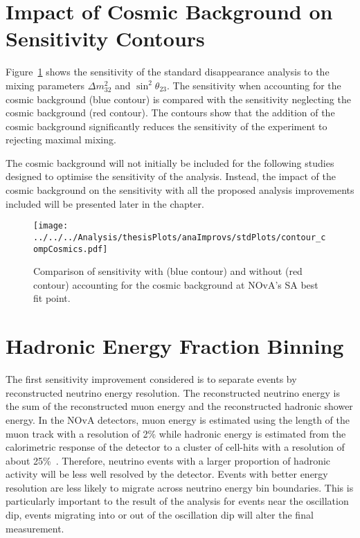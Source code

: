\section{Impact of Cosmic Background on Sensitivity Contours}

Figure~\ref{fig:stdContourWithCosmics} shows the sensitivity of the
standard disappearance analysis to the mixing parameters $\Delta
m^2_{32}$ and $\sin^2\theta_{23}$. The sensitivity when accounting for
the cosmic background (blue contour) is compared with the sensitivity
neglecting the cosmic background (red contour). 
The contours show that the addition of the cosmic background
significantly reduces the sensitivity of the experiment to rejecting
maximal mixing.  

The cosmic background will not initially be included for the following
studies designed to optimise the sensitivity of the analysis. 
Instead, the impact of the cosmic background on the sensitivity with
all the proposed analysis improvements included will be presented
later in the chapter.



\begin{figure}
  \centering
\texttt{[image: ../../../Analysis/thesisPlots/anaImprovs/stdPlots/contour\_compCosmics.pdf]}
  \caption{
    Comparison of sensitivity with (blue contour) and without (red
    contour) accounting for the cosmic background at NOvA's SA best fit
    point.
  } 
  \label{fig:stdContourWithCosmics}
\end{figure}



\section{Hadronic Energy Fraction Binning}

The first sensitivity improvement considered is to separate events by
reconstructed neutrino energy resolution. 
The reconstructed neutrino energy is the sum of the reconstructed
muon energy and the reconstructed hadronic shower energy.
In the NOvA detectors, muon energy is estimated using the length of
the muon track with a resolution of 2\% while hadronic energy is
estimated from the calorimetric response of the detector to a cluster
of cell-hits with a resolution of about 25\%~\cite{NOvASA}. 
Therefore, neutrino events with a larger proportion of hadronic
activity will be less well resolved by the detector.
Events with better energy resolution are less likely to migrate
across neutrino energy bin boundaries. This is particularly important
to the result of the analysis for events near the oscillation dip,
events migrating into or out of the oscillation dip will alter the
final measurement. 


